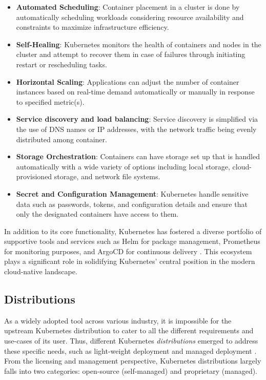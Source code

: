 \begin{itemize}

\item \textbf{Automated Scheduling}: Container placement in a cluster is done by automatically scheduling workloads considering resource availability and constraints to maximize infrastructure efficiency. 

\item \textbf{Self-Healing}: Kubernetes monitors the health of containers and nodes in the cluster and attempt to recover them in case of failures through initiating restart or rescheduling tasks.

\item \textbf{Horizontal Scaling}: Applications can adjust the number of container instances based on real-time demand automatically or manually in response to specified metric(s).

\item \textbf{Service discovery and load balancing}: Service discovery is simplified via the use of DNS names or IP addresses, with the network traffic being evenly distributed among container.

\item \textbf{Storage Orchestration}: Containers can have storage set up that is handled automatically with a wide variety of options including local storage, cloud-provisioned storage, and network file systems.

\item \textbf{Secret and Configuration Management}: Kubernetes handle sensitive data such as passwords, tokens, and configuration details and ensure that only the designated containers have access to them. 

\end{itemize}

In addition to its core functionality, Kubernetes has fostered a diverse portfolio of supportive tools and services such as Helm for package management, Prometheus for monitoring purposes, and ArgoCD for continuous delivery \cite{Helm, prometheusOverviewPrometheus, ArgoCDDeclarative}. This ecosystem plays a significant role in solidifying Kubernetes' central position in the modern cloud-native landscape.

\subsection{Distributions}
As a widely adopted tool across various industry, it is impossible for the upstream Kubernetes distribution to cater to all the different requirements and use-cases of its user. Thus, different Kubernetes \textit{distributions} emerged to address these specific needs, such as light-weight deployment and managed deployment \cite{bohmProfilingLightweightContainer2021, pereiraferreiraPerformanceEvaluationContainers2019}. From the licensing and management perspective, Kubernetes distributions largely falls into two categories: open-source (self-managed) and proprietary (managed).

